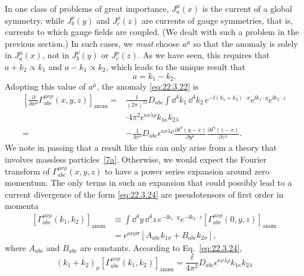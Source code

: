 In one class of problems of great importance, $J_a^\mu(x)$ is the
current of a global symmetry, while $J_b^\nu(y)$ and
$J_c^\rho(z)$ are currents of gauge symmetries, that is, currents to
which gauge fields are coupled. (We dealt with such a problem in the
previous section.) In such cases, we \emph{must} choose $a^\mu$ so that the
anomaly is solely in $J_a^\mu(x)$, not in $J_b^\nu(y)$ or
$J_c^\rho(z)$. As we have seen, this requires that
$a+k_2\propto k_1$ and $a-k_1\propto k_2$, which leads to the unique result
that
\begin{equation}
 a=k_1-k_2.
 \tag{22.3.23}\label{eq:22.3.23}
\end{equation}
Adopting this value of $a^\mu$, the anomaly \eqref{eq:22.3.22} is
\begin{equation}
 \begin{aligned}
 \left[
  \frac{\partial}{\partial x^\mu}
  \Gamma_{abc}^{\mu\nu\rho}(x,y,z)
 \right]_{\mathrm{anom}}
 ={}&\frac{1}{(2\pi)^{12}}D_{abc}
 \int \dd^4k_1\,\dd^4k_2\,
 e^{-\ii(k_1+k_2)\cdot x}e^{\ii k_1\cdot y}e^{\ii k_2\cdot z}
 \\
 &\cdot4\pi^2\epsilon^{\kappa\nu\lambda\rho}
 k_{1\kappa}k_{2\lambda}
 \\
 ={}&-\frac{1}{4\pi^2}D_{abc}
 \epsilon^{\kappa\nu\lambda\rho}
 \frac{\partial\delta^4(y-x)}{\partial y^\kappa}
 \frac{\partial\delta^4(z-x)}{\partial z^\lambda}.
 \end{aligned}
 \tag{22.3.24}\label{eq:22.3.24}
\end{equation}
We note in passing that a result like this can only arise from a theory
that involves massless particles~\hyperref[ch22-ref-7a]{[7a]}. Otherwise,
we would expect the Fourier transform of
$\Gamma_{abc}^{\mu\nu\rho}(x,y,z)$ to have a power series
expansion around zero momentum. The only terms in such an expansion that
could possibly lead to a current divergence of the form
\eqref{eq:22.3.24} are pseudotensors of first order in momenta
\[
 \begin{aligned}
 \left[
  \Gamma_{abc}^{\mu\nu\rho}(k_1,k_2)
 \right]_{\mathrm{anom}}
 &\equiv\int \dd^4y\,\dd^4z\,
 e^{-\ii k_1\cdot y}e^{-\ii k_2\cdot z}
 \left[
  \Gamma_{abc}^{\mu\nu\rho}(0,y,z)
 \right]_{\mathrm{anom}}
 \\
 &=\epsilon^{\mu\nu\rho\sigma}
 \left[
  A_{abc}k_{1\sigma}
  +B_{abc}k_{2\sigma}
 \right],
 \end{aligned}
\]
where $A_{abc}$ and $B_{abc}$ are constants.
According to Eq.~\eqref{eq:22.3.24},
\[
 (k_1+k_2)_\mu
 \left[
  \Gamma_{abc}^{\mu\nu\rho}(k_1,k_2)
 \right]_{\mathrm{anom}}
 =\frac{\ii}{4\pi^2}D_{abc}
 \epsilon^{\kappa\nu\lambda\rho}k_{1\kappa}k_{2\lambda}
\]
